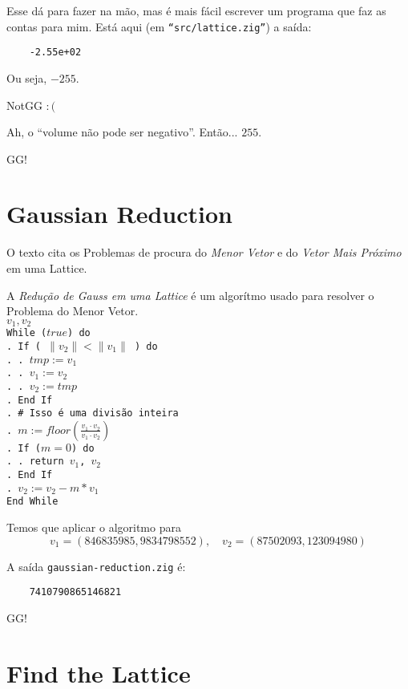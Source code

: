 \documentclass{article}
\begin{document}
Esse dá para fazer na mão,
mas é mais fácil escrever um programa que faz as contas para mim.
Está aqui (em \texttt{``src/lattice.zig''}) a saída:
\begin{verbatim}
    -2.55e+02
\end{verbatim}

Ou seja, \(-255\).

NotGG \(:(\)

Ah, o ``volume não pode ser negativo''.
Então... \(255\).

GG!

\section{Gaussian Reduction}

O texto cita os Problemas de procura
do \emph{Menor Vetor} e do \emph{Vetor Mais Próximo}
em uma Lattice.

A \emph{Redução de Gauss em uma Lattice} é um algorítmo
usado para resolver o Problema do Menor Vetor.
\texttt{ \\
    \( v_1, v_2 \) \\
    While (\(true\)) do \\
    . If ( \(\|v_2\| < \|v_1\|\) ) do \\
    . . \(tmp := v_1\) \\
    . . \(v_1 := v_2\) \\
    . . \(v_2 := tmp\) \\
    . End If \\
    . \# Isso é uma divisão inteira \\
    . \(m := floor\left(\frac{ v_1 \cdot v_2 }{ v_1 \cdot v_2 }\right) \) \\
    . If (\(m = 0\)) do \\
    . . return \(v_1\), \(v_2\) \\
    . End If \\
    . \(v_2 := v_2 - m * v_1\) \\
    End While
}

Temos que aplicar o algoritmo para
\[
    v_1 = (846835985, 9834798552), \quad
    v_2 = (87502093, 123094980)
\]

A saída \texttt{gaussian-reduction.zig} é:
\begin{verbatim}
    7410790865146821
\end{verbatim}

GG!

\section{Find the Lattice}
\end{document}
